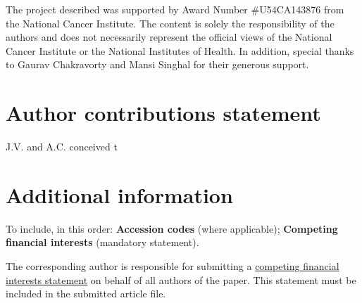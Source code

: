 \documentclass[fleqn,10pt]{wlscirep}
\begin{document}
The project described was supported by Award Number \#U54CA143876 from the National Cancer Institute.  
The content is solely the responsibility of the authors and does not necessarily represent the official views of the National Cancer Institute or the National Institutes of Health. 
In addition, special thanks to Gaurav Chakravorty and Mansi Singhal for their generous support. 

\section*{Author contributions statement}
J.V. and A.C. conceived t 

\section*{Additional information}

To include, in this order: \textbf{Accession codes} (where applicable); \textbf{Competing financial interests} (mandatory statement). 

The corresponding author is responsible for submitting a \href{http://www.nature.com/srep/policies/index.html#competing}{competing financial interests statement} on behalf of all authors of the paper. This statement must be included in the submitted article file.

%

%

%

\end{document}
